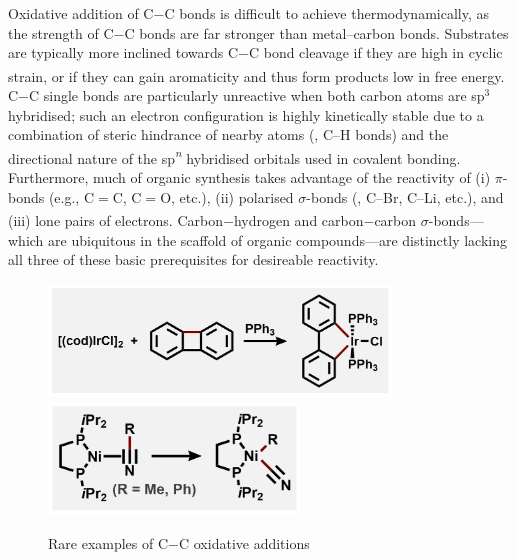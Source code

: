 Oxidative addition of C$-$C bonds is difficult to achieve thermodynamically, as the strength of C$-$C bonds are far stronger than metal--carbon bonds. Substrates are typically more inclined towards C$-$C bond cleavage if they are high in cyclic strain, or if they can gain aromaticity and thus form products low in free energy.\textsuperscript{\cite{sattler:2010, crabtree:2019}} C$-$C single bonds are particularly unreactive when both carbon atoms are sp$^3$ hybridised; such an electron configuration is highly kinetically stable due to a combination of steric hindrance of nearby atoms (\eg, C--H bonds) and the directional nature of the sp\textit{\textsuperscript{n}} hybridised orbitals used in covalent bonding. Furthermore, much of organic synthesis takes advantage of the reactivity of (i) $\pi$-bonds (e.g., C$=$C, C$=$O, etc.), (ii) polarised $\sigma$-bonds (\eg, C--Br, C--Li, etc.), and (iii) lone pairs of electrons.\textsuperscript{\cite{murakami:2016}} Carbon$-$hydrogen and carbon$-$carbon $\sigma$-bonds---which are ubiquitous in the scaffold of organic compounds---are distinctly lacking all three of these basic prerequisites for desireable reactivity.

\begin{figure}
\centering
\begin{minipage}{\textwidth}
   \centering
   \includegraphics[height=3cm]{gfx/crabtree1} %
   \includegraphics[height=3cm]{gfx/crabtree2} %
   \caption{Rare examples of C$-$C oxidative additions}
   \label{fig:crabtree}
\end{minipage}\hfill
\end{figure}


